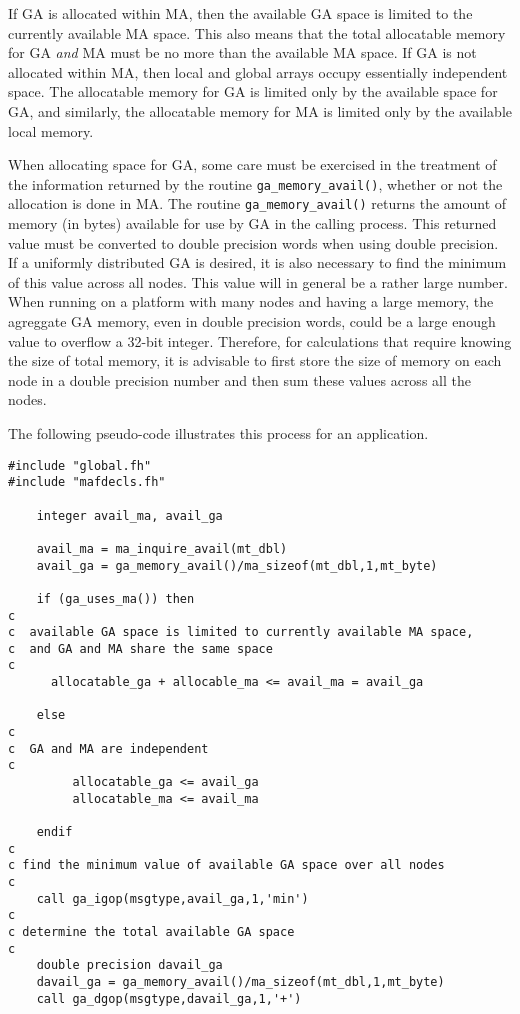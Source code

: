 If GA is allocated within MA, then 
the available GA space is limited to the currently available MA space.  This
also means that the total allocatable memory for GA {\em and} MA must be
no more than the available MA space.
If GA is not allocated within MA, then local and global arrays occupy essentially
independent space.  The allocatable memory for GA is limited only by the available
space for GA, and similarly, the allocatable memory for MA is limited only
by the available local memory.

When allocating space for GA,
some care must be exercised in the treatment of the information returned by
the routine \verb+ga_memory_avail()+, whether or not
the allocation is done in MA.  The routine \verb+ga_memory_avail()+
returns the amount of memory (in bytes)
available for use by GA in the calling process.
This returned value must be converted to double precision words when
using double precision.
If a uniformly distributed GA is desired, it is also necessary to find
the minimum of this value across all nodes.  This value will in general be
a rather large number.
When running on a platform with many nodes and having a large memory, 
the agreggate GA memory, even in double precision words, could be a large enough
value to overflow a
32-bit integer.  Therefore, for calculations that require knowing the size of
total memory, it is advisable to first store the size of memory on each node 
in a double precision
number and then sum these values across all the nodes.

The following pseudo-code illustrates this process for an application.

\begin{verbatim}
#include "global.fh"
#include "mafdecls.fh"

    integer avail_ma, avail_ga

    avail_ma = ma_inquire_avail(mt_dbl)
    avail_ga = ga_memory_avail()/ma_sizeof(mt_dbl,1,mt_byte)

    if (ga_uses_ma()) then
c
c  available GA space is limited to currently available MA space,
c  and GA and MA share the same space
c
      allocatable_ga + allocable_ma <= avail_ma = avail_ga

    else
c
c  GA and MA are independent
c
         allocatable_ga <= avail_ga
         allocatable_ma <= avail_ma

    endif
c
c find the minimum value of available GA space over all nodes
c
    call ga_igop(msgtype,avail_ga,1,'min')
c
c determine the total available GA space
c
    double precision davail_ga
    davail_ga = ga_memory_avail()/ma_sizeof(mt_dbl,1,mt_byte)
    call ga_dgop(msgtype,davail_ga,1,'+')

\end{verbatim}


